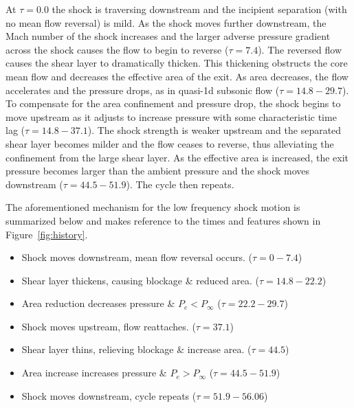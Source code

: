 \documentclass[]{aiaa-tc}%
\begin{document}



At $\tau=0.0$ the shock is traversing downstream and the incipient separation (with no mean flow reversal) is mild.  As the shock moves further downstream, the Mach number of the shock increases and the larger adverse pressure gradient across the shock causes the flow to begin to reverse ($\tau=7.4$).  The reversed flow causes the shear layer to dramatically thicken.  This thickening obstructs the core mean flow and decreases the effective area of the exit.  As area decreases, the flow accelerates and the pressure drops, as in quasi-1d subsonic flow ($\tau=14.8-29.7$).  To compensate for the area confinement and pressure drop, the shock begins to move upstream as it adjusts to increase pressure with some characteristic time lag ($\tau=14.8-37.1$).  The shock strength is weaker upstream and the separated shear layer becomes milder and the flow ceases to reverse, thus alleviating the confinement from the large shear layer.  As the effective area is increased, the exit pressure becomes larger than the ambient pressure and the shock moves downstream ($\tau=44.5-51.9$).   The cycle then repeats.

The aforementioned mechanism for the low frequency shock motion is summarized below and makes reference to the times and features shown in Figure~\ref{fig:history}.
\begin{itemize}
	\item Shock moves downstream, mean flow reversal occurs. ($\tau=0-7.4$)
	\item Shear layer thickens, causing blockage \& reduced area. ($\tau=14.8-22.2$)
	\item Area reduction decreases pressure \& $P_e < P_{\infty}$ ($\tau=22.2-29.7$)
	\item Shock moves upstream, flow reattaches. ($\tau=37.1$)
	\item Shear layer thins, relieving blockage \& increase area. ($\tau=44.5$)
	\item Area increase increases pressure \& $P_e > P_{\infty}$ ($\tau=44.5-51.9$)
	\item Shock moves downstream, cycle repeats ($\tau=51.9-56.06$)
\end{itemize}
\end{document}
